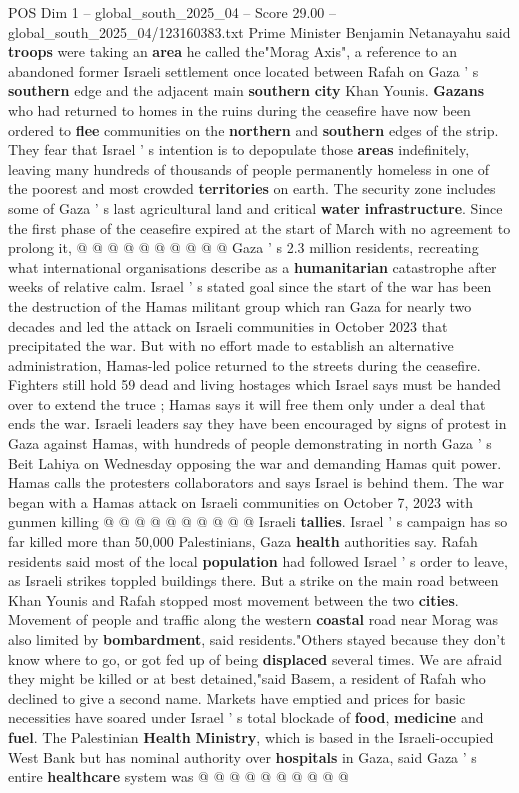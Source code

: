 \begin{textsample}{POS Dim 1 – global\_south\_2025\_04 – Score 29.00 – global\_south\_2025\_04/123160383.txt}
Prime Minister Benjamin Netanayahu said \textbf{troops} were taking an \textbf{area} he called the"Morag Axis", a reference to an abandoned former Israeli settlement once located between Rafah on Gaza ' s \textbf{southern} edge and the adjacent main \textbf{southern} \textbf{city} Khan Younis. \textbf{Gazans} who had returned to homes in the ruins during the ceasefire have now been ordered to \textbf{flee} communities on the \textbf{northern} and \textbf{southern} edges of the strip.
They fear that Israel ' s intention is to depopulate those \textbf{areas} indefinitely, leaving many hundreds of thousands of people permanently homeless in one of the poorest and most crowded \textbf{territories} on earth.
The security zone includes some of Gaza ' s last agricultural land and critical \textbf{water} \textbf{infrastructure}.
Since the first phase of the ceasefire expired at the start of March with no agreement to prolong it, @ @ @ @ @ @ @ @ @ @ Gaza ' s 2.3 million residents, recreating what international organisations describe as a \textbf{humanitarian} catastrophe after weeks of relative calm.
Israel ' s stated goal since the start of the war has been the destruction of the Hamas militant group which ran Gaza for nearly two decades and led the attack on Israeli communities in October 2023 that precipitated the war.
But with no effort made to establish an alternative administration, Hamas-led police returned to the streets during the ceasefire.
Fighters still hold 59 dead and living hostages which Israel says must be handed over to extend the truce ; Hamas says it will free them only under a deal that ends the war.
Israeli leaders say they have been encouraged by signs of protest in Gaza against Hamas, with hundreds of people demonstrating in north Gaza ' s Beit Lahiya on Wednesday opposing the war and demanding Hamas quit power.
Hamas calls the protesters collaborators and says Israel is behind them.
The war began with a Hamas attack on Israeli communities on October 7, 2023 with gunmen killing @ @ @ @ @ @ @ @ @ @ Israeli \textbf{tallies}.
Israel ' s campaign has so far killed more than 50,000 Palestinians, Gaza \textbf{health} authorities say.
Rafah residents said most of the local \textbf{population} had followed Israel ' s order to leave, as Israeli strikes toppled buildings there.
But a strike on the main road between Khan Younis and Rafah stopped most movement between the two \textbf{cities}.
Movement of people and traffic along the western \textbf{coastal} road near Morag was also limited by \textbf{bombardment}, said residents."Others stayed because they don't know where to go, or got fed up of being \textbf{displaced} several times.
We are afraid they might be killed or at best detained,"said Basem, a resident of Rafah who declined to give a second name.
Markets have emptied and prices for basic necessities have soared under Israel ' s total blockade of \textbf{food}, \textbf{medicine} and \textbf{fuel}.
The Palestinian \textbf{Health} \textbf{Ministry}, which is based in the Israeli-occupied West Bank but has nominal authority over \textbf{hospitals} in Gaza, said Gaza ' s entire \textbf{healthcare} system was @ @ @ @ @ @ @ @ @ @


\end{textsample}
